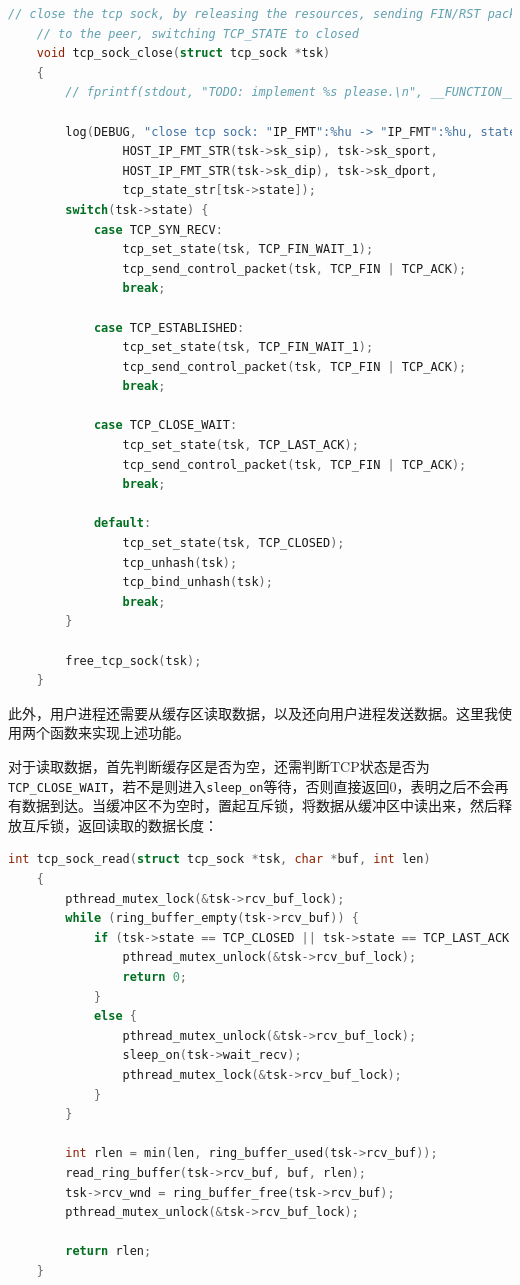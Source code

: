 \documentclass[UTF8]{report}
\begin{document}
\begin{lstlisting}[language=C]
    // close the tcp sock, by releasing the resources, sending FIN/RST packet
    // to the peer, switching TCP_STATE to closed
    void tcp_sock_close(struct tcp_sock *tsk)
    {
        // fprintf(stdout, "TODO: implement %s please.\n", __FUNCTION__);
    
        log(DEBUG, "close tcp sock: "IP_FMT":%hu -> "IP_FMT":%hu, state: %s.",
                HOST_IP_FMT_STR(tsk->sk_sip), tsk->sk_sport,
                HOST_IP_FMT_STR(tsk->sk_dip), tsk->sk_dport,
                tcp_state_str[tsk->state]);
        switch(tsk->state) {
            case TCP_SYN_RECV:
                tcp_set_state(tsk, TCP_FIN_WAIT_1);
                tcp_send_control_packet(tsk, TCP_FIN | TCP_ACK);
                break;
    
            case TCP_ESTABLISHED:
                tcp_set_state(tsk, TCP_FIN_WAIT_1);
                tcp_send_control_packet(tsk, TCP_FIN | TCP_ACK);
                break;
    
            case TCP_CLOSE_WAIT:
                tcp_set_state(tsk, TCP_LAST_ACK);
                tcp_send_control_packet(tsk, TCP_FIN | TCP_ACK);
                break;
    
            default:
                tcp_set_state(tsk, TCP_CLOSED);
                tcp_unhash(tsk);
                tcp_bind_unhash(tsk);
                break;
        }
    
        free_tcp_sock(tsk);
    }
\end{lstlisting}

此外，用户进程还需要从缓存区读取数据，以及还向用户进程发送数据。这里我使用两个函数来实现上述功能。

对于读取数据，首先判断缓存区是否为空，还需判断TCP状态是否为\texttt{TCP_CLOSE_WAIT}，若不是则进入\texttt{sleep_on}等待，否则直接返回0，表明之后不会再有数据到达。当缓冲区不为空时，置起互斥锁，将数据从缓冲区中读出来，然后释放互斥锁，返回读取的数据长度：

\begin{lstlisting}[language=C]
    int tcp_sock_read(struct tcp_sock *tsk, char *buf, int len)
    {
        pthread_mutex_lock(&tsk->rcv_buf_lock);
        while (ring_buffer_empty(tsk->rcv_buf)) {
            if (tsk->state == TCP_CLOSED || tsk->state == TCP_LAST_ACK || tsk->state == TCP_CLOSE_WAIT) {
                pthread_mutex_unlock(&tsk->rcv_buf_lock);
                return 0;
            }
            else {
                pthread_mutex_unlock(&tsk->rcv_buf_lock);
                sleep_on(tsk->wait_recv);
                pthread_mutex_lock(&tsk->rcv_buf_lock);
            }
        }
    
        int rlen = min(len, ring_buffer_used(tsk->rcv_buf));
        read_ring_buffer(tsk->rcv_buf, buf, rlen);
        tsk->rcv_wnd = ring_buffer_free(tsk->rcv_buf);
        pthread_mutex_unlock(&tsk->rcv_buf_lock);
    
        return rlen;
    }
\end{lstlisting}
\end{document}
